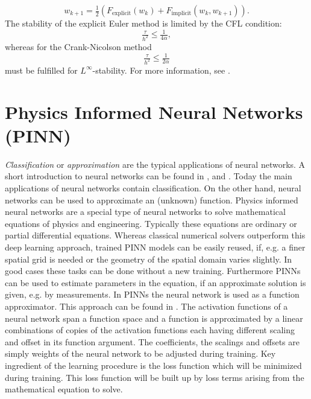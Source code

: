 \documentclass[a4paper,11pt]{article}
\theoremstyle{plain} %
\theoremstyle{definition} %
\theoremstyle{remark} %
\def\uTemp{u}
\def\uTemp{w}
\begin{document}
\begin{equation*}
\uTemp_{k+1} = \tfrac{1}{2}\left(  F_{\mathrm{explicit}} (\uTemp_k)  + F_{\mathrm{implicit}} (\uTemp_k, \uTemp_{k+1})  \right) .
\end{equation*}
The stability of the explicit Euler method is limited by the CFL condition:
\begin{equation*}
\tfrac{\tau }{h^2 } \leq \tfrac{1}{4\alpha }, 
\end{equation*}
whereas for the Crank-Nicolson method
\begin{equation*}
\tfrac{\tau }{h^2 } \leq \tfrac{1}{2\alpha }
\end{equation*}
must be fulfilled for $L^\infty $-stability. For more information, see \cite[p 112]{Ernst2015}.

\section{Physics Informed Neural Networks (PINN)}
\emph{Classification} or \emph{approximation} are the typical applications of neural networks. A short introduction to neural networks can be found in \cite[pp. 809]{stoecker1995formeln}, \cite{rey2011neuralnetworks} and \cite{rojas1993neuronale}. Today the main applications of neural networks contain classification. On the other hand, neural networks can be used to approximate an (unknown) function. Physics informed neural networks are a special type of neural networks to solve mathematical equations of physics and engineering. Typically these equations are ordinary or partial differential equations. Whereas classical numerical solvers outperform this deep learning approach, trained PINN models can be easily reused, if, e.g. a finer spatial grid is needed or the geometry of the spatial domain varies slightly. In good cases these tasks can be done without a new training. Furthermore PINNs can be used to estimate parameters in the equation, if an approximate solution is given, e.g. by measurements. In PINNs the neural network is used as a function approximator. This approach can be found in \cite[Section 3.2]{lopez2008}. The activation functions of a neural network span a function space and a function is approximated by a linear combinations of copies of the activation functions each having different scaling and offset in its function argument. The coefficients, the scalings and offsets are simply weights of the neural network to be adjusted during training. Key ingredient of the learning procedure is the loss function which will be minimized during training. This loss function will be built up by loss terms arising from the mathematical equation to solve.
\end{document}
